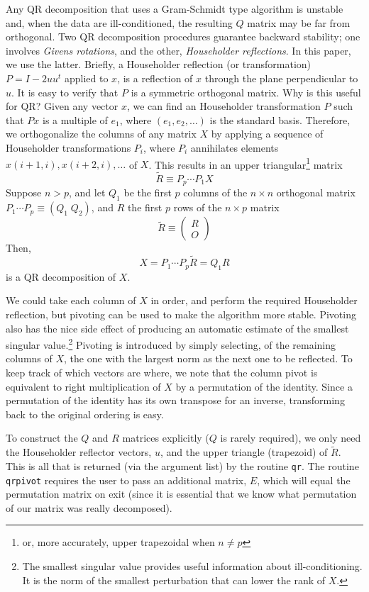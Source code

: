 \documentclass{article}
\begin{document}
Any QR decomposition that uses a Gram-Schmidt 
type algorithm is unstable and, when the data are ill-conditioned,
the resulting $Q$ matrix may be far from orthogonal.  Two 
QR decomposition procedures guarantee backward stability; 
one involves \emph{Givens rotations}, and 
the other, \emph{Householder reflections}.  In this paper, we use
the latter.  Briefly, a
Householder reflection (or transformation) $P = I - 2uu^t$ applied to
$x$, is a reflection of $x$ through the plane perpendicular
to $u$.  It is easy to verify that $P$ is a symmetric orthogonal matrix.
Why is this useful for QR?  Given any vector $x$, we can find an 
Householder transformation $P$ such that $Px$ is a multiple of $e_1$,
where $(e_1,e_2,\ldots)$ is the standard basis.  Therefore, we
orthogonalize the columns of any matrix $X$ by applying a sequence of
Householder transformations $P_i$, where $P_i$ annihilates 
elements $x(i+1,i),x(i+2,i),\ldots $ of $X$.  This results in an
upper triangular\footnote{or, more accurately, upper trapezoidal when $n\neq
p$} matrix  
\[\tilde R \equiv P_p\cdots P_1X \]
Suppose $n>p$, and let $Q_1$ be the first $p$ columns of the
$n\times n$ orthogonal matrix $P_1\cdots P_p \equiv (Q_1 \; Q_2)$, and $R$ 
the first $p$ rows of the $n\times p$ matrix 
\[\tilde R \equiv \left(\begin{array}{c}
R \\ O \end{array}\right)\]
Then,
\begin{equation}
\label{eqn:QR}
X = P_1\cdots P_p\tilde R = Q_1R
\end{equation}
is a QR decomposition of $X$.

We could take each column of $X$ in order, and perform the required
Householder reflection, 
but pivoting can be used to make the algorithm more stable.  Pivoting also
has the nice side effect of producing 
an automatic estimate of the smallest singular value.\footnote{The
smallest singular value provides useful information about
ill-conditioning.  It is the norm of the smallest perturbation
that can lower the rank of $X$.}  Pivoting is introduced 
by simply selecting, of the remaining columns of $X$, the one with the
largest norm as the next one to be reflected.  To keep track of which 
vectors are where, we note that the column pivot is equivalent to
right multiplication of $X$ by a permutation of the identity.  Since
a permutation of the identity has its own transpose for an inverse, 
transforming back to the original ordering is easy.  

To construct the $Q$ and $R$ matrices explicitly ($Q$ is rarely
required), we only need the Householder reflector vectors, $u$, 
and the upper triangle (trapezoid) of $\tilde R$.  
This is all that is returned (via the
argument list) by the routine {\tt qr}.  The routine {\tt qrpivot}
requires the user to pass an additional matrix, $E$, which will equal the 
permutation matrix on exit (since it is essential that we know what
permutation of our matrix was really decomposed).
\end{document}
